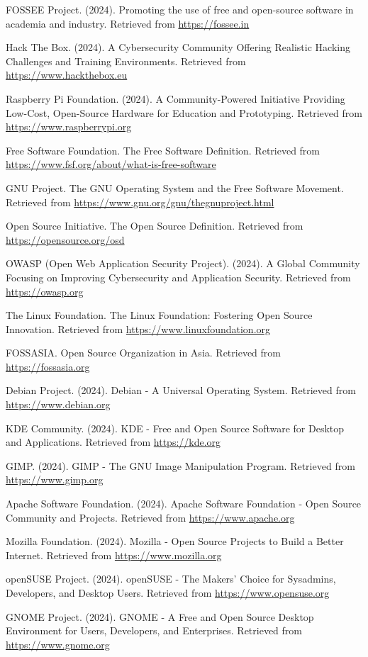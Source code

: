 \documentclass[12pt,a4paper]{article}
\begin{document}
\begin{thebibliography}{20}
FOSSEE Project. (2024). Promoting the use of free and open-source software in academia and industry. Retrieved from \url{https://fossee.in}

 Hack The Box. (2024). A Cybersecurity Community Offering Realistic Hacking Challenges and Training Environments. Retrieved from \url{https://www.hackthebox.eu}

 Raspberry Pi Foundation. (2024). A Community-Powered Initiative Providing Low-Cost, Open-Source Hardware for Education and Prototyping. Retrieved from \url{https://www.raspberrypi.org}

Free Software Foundation. The Free Software Definition. Retrieved from \url{https://www.fsf.org/about/what-is-free-software}

GNU Project. The GNU Operating System and the Free Software Movement. Retrieved from \url{https://www.gnu.org/gnu/thegnuproject.html}

Open Source Initiative. The Open Source Definition. Retrieved from \url{https://opensource.org/osd}

 OWASP (Open Web Application Security Project). (2024). A Global Community Focusing on Improving Cybersecurity and Application Security. Retrieved from \url{https://owasp.org}

The Linux Foundation. The Linux Foundation: Fostering Open Source Innovation. Retrieved from \url{https://www.linuxfoundation.org}

FOSSASIA. Open Source Organization in Asia. Retrieved from \url{https://fossasia.org}

 Debian Project. (2024). Debian - A Universal Operating System. Retrieved from \url{https://www.debian.org}

 KDE Community. (2024). KDE - Free and Open Source Software for Desktop and Applications. Retrieved from \url{https://kde.org}

 GIMP. (2024). GIMP - The GNU Image Manipulation Program. Retrieved from \url{https://www.gimp.org}

 Apache Software Foundation. (2024). Apache Software Foundation - Open Source Community and Projects. Retrieved from \url{https://www.apache.org}

 Mozilla Foundation. (2024). Mozilla - Open Source Projects to Build a Better Internet. Retrieved from \url{https://www.mozilla.org}

 openSUSE Project. (2024). openSUSE - The Makers' Choice for Sysadmins, Developers, and Desktop Users. Retrieved from \url{https://www.opensuse.org}

 GNOME Project. (2024). GNOME - A Free and Open Source Desktop Environment for Users, Developers, and Enterprises. Retrieved from \url{https://www.gnome.org}

\end{thebibliography}
\end{document}
